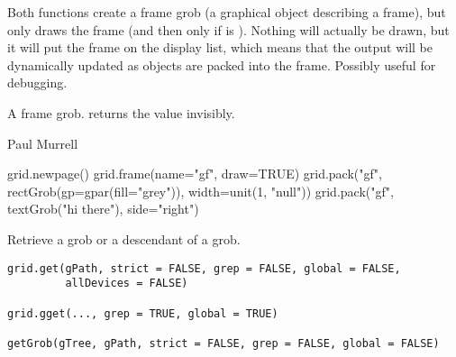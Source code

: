 %
\begin{Details}\relax
Both functions create a frame grob (a graphical object describing a
frame), but only 
draws the frame (and then only if  is ).
Nothing will actually be
drawn, but it will put the frame on the display list, which means
that the output will be dynamically updated as objects are packed
into the frame.  Possibly useful for debugging.
\end{Details}
%
\begin{Value}
A frame grob.   returns the value invisibly.
\end{Value}
%
\begin{Author}\relax
 Paul Murrell 
\end{Author}
%
\begin{SeeAlso}\relax
{}
\end{SeeAlso}
%
\begin{Examples}
\begin{ExampleCode}
grid.newpage()
grid.frame(name="gf", draw=TRUE)
grid.pack("gf", rectGrob(gp=gpar(fill="grey")), width=unit(1, "null"))
grid.pack("gf", textGrob("hi there"), side="right")
\end{ExampleCode}
\end{Examples}
%
\begin{Description}\relax
Retrieve a grob or a descendant of a grob.
\end{Description}
%
\begin{Usage}
\begin{verbatim}
grid.get(gPath, strict = FALSE, grep = FALSE, global = FALSE,
         allDevices = FALSE)

grid.gget(..., grep = TRUE, global = TRUE)

getGrob(gTree, gPath, strict = FALSE, grep = FALSE, global = FALSE) 
\end{verbatim}
\end{Usage}
%
